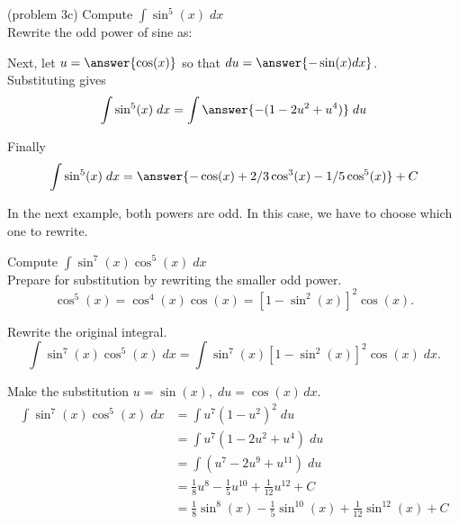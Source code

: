 \documentclass{ximera}
\begin{document}
\begin{problem}{\color{gray}(problem 3c)} 
Compute $\displaystyle{\int \sin^5(x) \; dx}$\\

Rewrite the odd power of sine as:

\begin{multipleChoice}
\end{multipleChoice}

Next, let $u = \answer{\cos(x)}$ so that $du = \answer{-\sin(x) dx}$.\\

Substituting gives
\[
\int \sin^5(x) \; dx= \int \answer{-(1-2u^2 + u^4)} \; du
\]

Finally
\[
\int \sin^5(x) \; dx= \answer{- \cos(x) + 2/3 \cos^3(x) - 1/5 \cos^5(x)} + C
\]

\end{problem}

In the next example, both powers are odd.  In this case, we have to choose which one to rewrite.



\begin{example}[example 4]
Compute $\displaystyle{\int \sin^7(x)\cos^5(x) \; dx}$\\

Prepare for substitution by rewriting the smaller odd power.
\[
\cos^5(x) = \cos^4(x) \cos(x) = \left[1-\sin^2(x)\right]^2 \cos(x).
\]

Rewrite the original integral.
\[
\int \sin^7(x)\cos^5(x) \; dx = \int \sin^7(x)\left[1 - \sin^2(x)\right]^2 \cos(x) \; dx.
\]

Make the substitution $u = \sin(x), \; du = \cos(x) \, dx$.
\begin{align*}
\int \sin^7(x)\cos^5(x) \; dx  &= \int u^7 (1-u^2)^2 \; du\\
   &= \int u^7(1 - 2u^2 + u^4) \; du\\
   &= \int (u^7 - 2u^9 + u^{11}) \; du\\
  &= \tfrac18 u^8 - \tfrac15 u^{10} + \tfrac{1}{12}u^{12}+ C \\
  &= \tfrac18 \sin^8(x) - \tfrac15 \sin^{10}(x) + \tfrac{1}{12} \sin^{12}(x)+ C
\end{align*}

\end{example}
\end{document}
